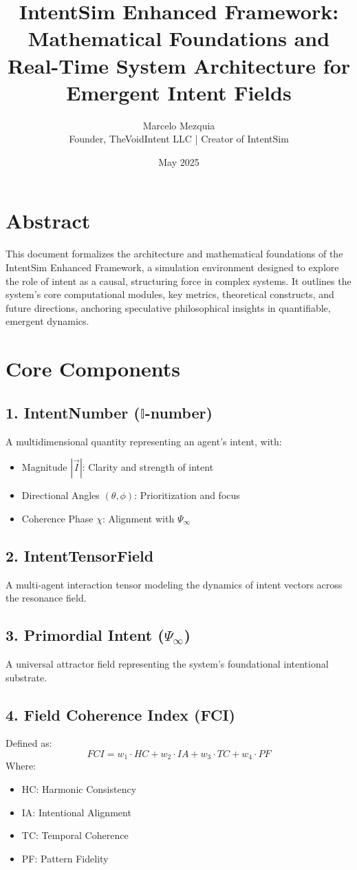 \documentclass[12pt]{article}
\title{\textbf{IntentSim Enhanced Framework:\\Mathematical Foundations and Real-Time System Architecture for Emergent Intent Fields}}
\author{Marcelo Mezquia \\ \small{Founder, TheVoidIntent LLC | Creator of IntentSim}}
\date{May 2025}
\begin{document}
\maketitle

\section*{Abstract}
This document formalizes the architecture and mathematical foundations of the IntentSim Enhanced Framework, a simulation environment designed to explore the role of intent as a causal, structuring force in complex systems. It outlines the system’s core computational modules, key metrics, theoretical constructs, and future directions, anchoring speculative philosophical insights in quantifiable, emergent dynamics.

\section{Core Components}

\subsection{1. IntentNumber ($\mathbb{I}$-number)}
A multidimensional quantity representing an agent’s intent, with:
\begin{itemize}
  \item Magnitude $|\vec{I}|$: Clarity and strength of intent
  \item Directional Angles $(\theta, \phi)$: Prioritization and focus
  \item Coherence Phase $\chi$: Alignment with $\Psi_\infty$
\end{itemize}

\subsection{2. IntentTensorField}
A multi-agent interaction tensor modeling the dynamics of intent vectors across the resonance field.

\subsection{3. Primordial Intent ($\Psi_\infty$)}
A universal attractor field representing the system’s foundational intentional substrate.

\subsection{4. Field Coherence Index (FCI)}
Defined as:
\[
FCI = w_1 \cdot HC + w_2 \cdot IA + w_3 \cdot TC + w_4 \cdot PF
\]
Where:
\begin{itemize}
  \item HC: Harmonic Consistency
  \item IA: Intentional Alignment
  \item TC: Temporal Coherence
  \item PF: Pattern Fidelity
\end{itemize}
\end{document}
